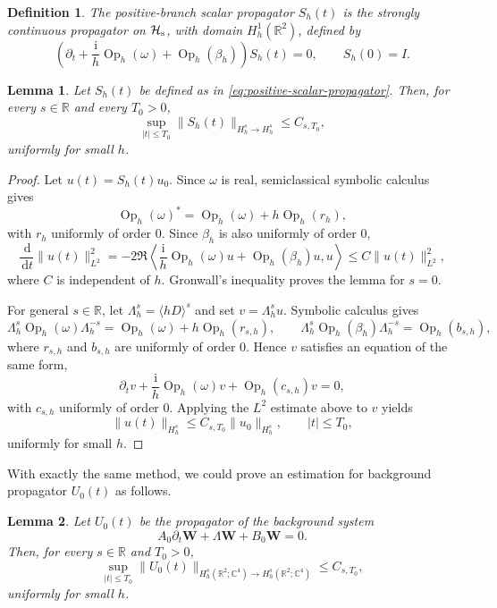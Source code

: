 \documentclass[11pt,reqno]{amsart}
\newtheorem{lemma}{Lemma}[section]
\newtheorem{definition}{Definition}[section]
\newcommand{\ii}{\mathrm{i}}
\newcommand{\dd}{\,\mathrm{d}}
\newcommand{\Op}{\operatorname{Op}}
\numberwithin{equation}{section}
\begin{document}
\begin{definition}
The positive-branch scalar propagator $S_h(t)$ is the strongly continuous propagator on $\mathcal H_{\rm s}$, with domain $H_h^1(\mathbb R^2)$, defined by
\begin{equation}\label{eq:positive-scalar-propagator}
    \left(\partial_t+\frac{\ii}{h}\Op_h(\omega)+\Op_h(\beta_h)\right)S_h(t)=0,
    \qquad
    S_h(0)=I.
\end{equation}
\end{definition}
\begin{lemma}\label{lem:scalar-energy-estimate}
Let $S_h(t)$ be defined as in \eqref{eq:positive-scalar-propagator}. Then, for every $s\in\mathbb R$ and every $T_0>0$,
$$
\sup_{|t|\le T_0}\|S_h(t)\|_{H_h^s\to H_h^s}\le C_{s,T_0},
$$
uniformly for small $h$.
\end{lemma}

\begin{proof}
Let $u(t)=S_h(t)u_0$. Since $\omega$ is real, semiclassical symbolic calculus gives
$$
\Op_h(\omega)^*=\Op_h(\omega)+h\Op_h(r_h),
$$
with $r_h$ uniformly of order $0$. Since $\beta_h$ is also uniformly of order $0$,
$$
\frac{\dd}{\dd t}\|u(t)\|_{L^2}^2=-2\Re\left\langle\frac{\ii}{h}\Op_h(\omega)u+\Op_h(\beta_h)u,u\right\rangle\le C\|u(t)\|_{L^2}^2,
$$
where $C$ is independent of $h$. Gronwall's inequality proves the lemma for $s=0$.

For general $s\in\mathbb R$, let $\Lambda_h^s=\langle hD\rangle^s$ and set
$v=\Lambda_h^su$. Symbolic calculus gives
$$
\Lambda_h^s\Op_h(\omega)\Lambda_h^{-s}=\Op_h(\omega)+h\Op_h(r_{s,h}), \qquad \Lambda_h^s\Op_h(\beta_h)\Lambda_h^{-s}=\Op_h(b_{s,h}),
$$
where $r_{s,h}$ and $b_{s,h}$ are uniformly of order $0$. Hence $v$ satisfies an equation of the same form,
$$
\partial_tv+\frac{\ii}{h}\Op_h(\omega)v+\Op_h(c_{s,h})v=0,
$$
with $c_{s,h}$ uniformly of order $0$. Applying the $L^2$ estimate above to $v$ yields
$$
\|u(t)\|_{H_h^s}\le C_{s,T_0}\|u_0\|_{H_h^s}, \qquad |t|\le T_0,
$$
uniformly for small $h$.
\end{proof}

With exactly the same method, we could prove an estimation for background propagator $U_0(t)$ as follows.
\begin{lemma}\label{lem:background-energy-estimate}
Let $U_0(t)$ be the propagator of the background system
$$
A_0\partial_t\bm W+\Lambda\bm W+B_0\bm W=0.
$$
Then, for every $s\in\mathbb R$ and $T_0>0$,
$$
\sup_{|t|\le T_0}\|U_0(t)\|_{H_h^s(\mathbb R^2;\mathbb C^4)\to H_h^s(\mathbb R^2;\mathbb C^4)}\le C_{s,T_0},
$$
uniformly for small $h$. 
\end{lemma}
\end{document}
